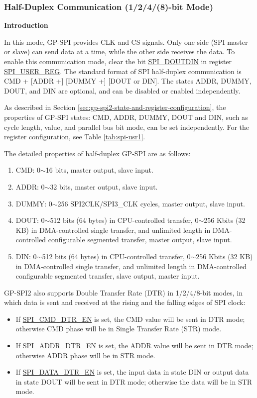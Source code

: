 \documentclass[main\_\_EN.tex]{subfiles}
\begin{document}
\subsubsection{Half-Duplex Communication (1/2/4/(8)-bit Mode)}
\label{sec:gp-spi2-1/2/8-bits}

\textbf{Introduction}

In this mode, GP-SPI provides CLK and CS signals. Only one side (SPI master or slave) can send data at a time, while the other side receives the data. To enable this communication mode, clear the bit \hyperref[fielddesc:SPIDOUTDIN]{SPI\_DOUTDIN} in register \hyperref[regdesc:SPIUSERREG]{SPI\_USER\_REG}. The standard format of SPI half-duplex communication is CMD + [ADDR +] [DUMMY +] [DOUT or DIN]. The states ADDR, DUMMY, DOUT, and DIN are optional, and can be disabled or enabled independently.

As described in Section \ref{sec:gp-spi2-state-and-register-configuration}, the properties of GP-SPI states: CMD, ADDR, DUMMY, DOUT and DIN, such as cycle length, value, and parallel bus bit mode, can be set independently. For the register configuration, see Table \ref{tab:spi-usr1}.

The detailed properties of half-duplex GP-SPI are as follows:

\begin{enumerate}
    \item CMD: 0$\sim$16 bits, master output, slave input.
    \item ADDR: 0$\sim$32 bits, master output, slave input.
    \item DUMMY: 0$\sim$256 SPI2CLK/SPI3\_CLK cycles, master output, slave input.
    \item DOUT: 0$\sim$512 bits (64 bytes) in CPU-controlled transfer, 0$\sim$256 Kbits (32 KB) in DMA-controlled single transfer, and unlimited length in DMA-controlled configurable segmented transfer, master output, slave input.
    \item DIN: 0$\sim$512 bits (64 bytes) in CPU-controlled transfer, 0$\sim$256 Kbits (32 KB) in DMA-controlled single transfer, and unlimited length in DMA-controlled configurable segmented transfer, slave output, master input.
\end{enumerate}

GP-SPI2 also supports Double Transfer Rate (DTR) in 1/2/4/8-bit modes, in which data is sent and received at the rising and the falling edges of SPI clock:

\begin{itemize}
    \item If \hyperref[fielddesc:SPICMDDTREN]{SPI\_CMD\_DTR\_EN} is set, the CMD value will be sent in DTR mode; otherwise CMD phase will be in Single Transfer Rate (STR) mode.
    \item If \hyperref[fielddesc:SPIADDRDTREN]{SPI\_ADDR\_DTR\_EN} is set, the ADDR value will be sent in DTR mode; otherwise ADDR phase will be in STR mode.
    \item If \hyperref[fielddesc:SPIDATADTREN]{SPI\_DATA\_DTR\_EN} is set, the input data in state DIN or output data in state DOUT will be sent in DTR mode; otherwise the data will be in STR mode.
\end{itemize}
\end{document}
